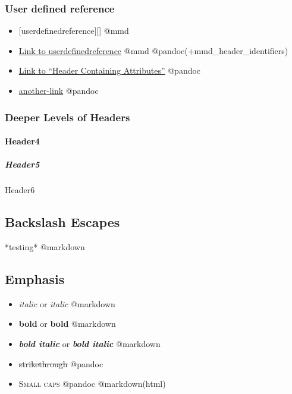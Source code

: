 \documentclass[]{article}
\providecommand{\tightlist}{%
  \setlength{\itemsep}{0pt}\setlength{\parskip}{0pt}}
\let\oldparagraph\paragraph
\renewcommand{\paragraph}[1]{\oldparagraph{#1}\mbox{}}
\let\oldsubparagraph\subparagraph
\renewcommand{\subparagraph}[1]{\oldsubparagraph{#1}\mbox{}}
\begin{document}
\hypertarget{userdefinedreference}{\subsubsection{User defined
reference}\label{userdefinedreference}}

\begin{itemize}
\tightlist
\item
  {[}userdefinedreference{]}{[}{]} @mmd
\item
  \protect\hyperlink{userdefinedreference}{Link to userdefinedreference}
  @mmd @pandoc(+mmd\_header\_identifiers)
\item
  \protect\hyperlink{identifier}{Link to ``Header Containing
  Attributes''} @pandoc
\item
  \protect\hyperlink{identifier}{another-link} @pandoc
\end{itemize}

\subsubsection{Deeper Levels of Headers}\label{deeper-levels-of-headers}

\paragraph{Header4}\label{header4}

\subparagraph{Header5}\label{header5}

Header6

\subsection{Backslash Escapes}\label{backslash-escapes}

*testing* @markdown

\hypertarget{emphasis}{\subsection{Emphasis}\label{emphasis}}

\begin{itemize}
\tightlist
\item
  \emph{italic} or \emph{italic} @markdown
\item
  \textbf{bold} or \textbf{bold} @markdown
\item
  \textbf{\emph{bold italic}} or \textbf{\emph{bold italic}} @markdown
\item
  \sout{strikethrough} @pandoc
\item
  \textsc{Small caps} @pandoc @markdown(html)
\end{itemize}
\end{document}
